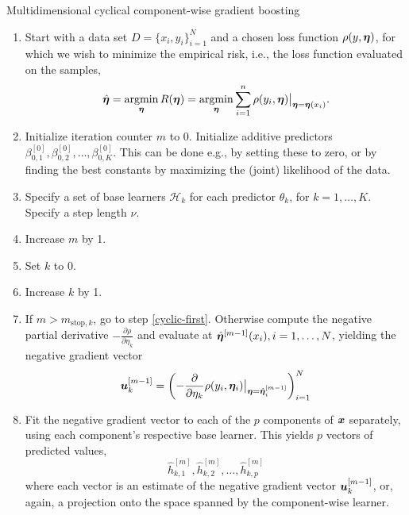 \begin{algorithm}
\caption{Multidimensional cyclical component-wise gradient boosting}
\label{algo:multi-cyclical}
\begin{enumerate}
    \item Start with a data set $D=\{x_i, y_i\}_{i=1}^N$ and a chosen loss function $\rho(y,\boldsymbol{\eta})$, for which we wish to
        minimize the empirical risk, i.e., the loss function evaluated on the samples,
        \begin{equation*}
            \hat{\boldsymbol{\eta}}=\operatorname*{argmin}_{\boldsymbol{\eta}}R(\boldsymbol{\eta})=\operatorname*{argmin}_{\boldsymbol{\eta}}\sum_{i=1}^n \rho(y_i,\boldsymbol{\eta})\big\rvert_{\boldsymbol{\eta}=\boldsymbol{\eta}(x_i)}.
        \end{equation*}
    \item Initialize iteration counter $m$ to 0. Initialize additive predictors $\beta_{0,1}^{[0]},\beta_{0,2}^{[0]},\ldots,\beta_{0,K}^{[0]}$. This can be done e.g., by setting these to zero, or by finding the best constants by maximizing the (joint) likelihood of the data.
    \item\label{initialization} Specify a set of base learners $\mathcal{H}_k$ for each predictor $\theta_k$, for $k=1,\ldots,K$. Specify a step length $\nu$.
    \item Increase $m$ by 1.
    \item Set $k$ to 0.
    \item\label{cyclic-first} Increase $k$ by 1.
    \item If $m>m_{\text{stop},k}$, go to step \ref{cyclic-first}. Otherwise compute the negative partial derivative
        $-\frac{\partial\rho}{\partial \eta_k}$ and evaluate at $\hat{\boldsymbol{\eta}}^{[m-1]}(x_i),i=1,\ldots,N$, yielding the
        negative gradient vector
        \begin{equation*}
            \bm{u}^{[m-1]}_k=\left(-\frac{\partial}{\partial \eta_k}\rho(y_i, \boldsymbol{\eta}_i)\big\rvert_{\boldsymbol{\eta}=\hat{\boldsymbol{\eta}}_{i}^{[m-1]}}\right)_{i=1}^N
        \end{equation*}
    \item Fit the negative gradient vector to each of the $p$ components of $\bm{x}$ separately, using each component's respective base learner. This yields $p$ vectors of predicted values,
        \begin{equation*}
            \hat{h}_{k,1}^{[m]},\hat{h}_{k,2}^{[m]},\ldots,\hat{h}_{k,p}^{[m]}
        \end{equation*}
        where each vector is an estimate of the negative gradient vector $\bm{u}^{[m-1]}_k$, or, again, a projection onto the space spanned by the component-wise learner.

\end{enumerate}
\end{algorithm}

